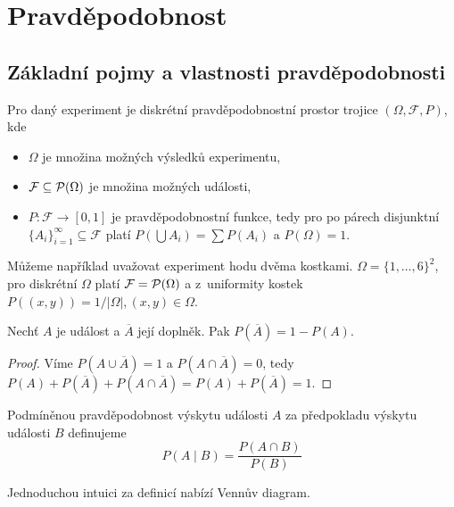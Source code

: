 \section{Pravděpodobnost}

\subsection{Základní pojmy a vlastnosti pravděpodobnosti}

\begin{definition}
Pro daný experiment je diskrétní pravděpodobnostní prostor trojice
$(\Omega, \mathcal{F}, P)$,
kde
\begin{itemize}
    \item $\Omega$ je množina možných výsledků experimentu,
    \item $\mathcal{F} \subseteq \mathcal{P}(\Omega)$ je množina možných události,
    \item $P : \mathcal{F} \to [0,1]$ je pravděpodobnostní funkce, tedy
        pro po párech disjunktní $\{A_i\}_{i=1}^\infty \subseteq \mathcal{F}$ platí
        $P(\bigcup A_i) = \sum P(A_i)$ a $P(\Omega) = 1$.
\end{itemize}
\end{definition}

\begin{example}
    Můžeme například uvažovat experiment hodu dvěma kostkami.
    $\Omega = \{1,\ldots,6\}^2$, pro diskrétní $\Omega$ platí
    $\mathcal{F} = \mathcal{P}(\Omega)$ a z~uniformity kostek
    $P((x,y)) = 1/\lvert \Omega \rvert, (x,y) \in \Omega$.
\end{example}

\begin{claim}
    Nechť $A$ je událost a $\overline{A}$ její doplněk. Pak
    $P(\overline{A}) = 1 - P(A)$.
\end{claim}

\begin{proof}
    Víme $P(A \cup \overline{A}) = 1$ a $P(A \cap \overline{A}) = 0$,
	tedy $P(A) + P(\overline{A}) + P(A \cap \overline{A}) = P(A) + P(\overline{A}) = 1$.
\end{proof}

\begin{definition}
Podmíněnou pravděpodobnost výskytu události $A$ za předpokladu výskytu
události $B$ definujeme
\[
    P(A \mid B) = \frac{P(A \cap B)}{P(B)}
\]
\end{definition}

Jednoduchou intuici za definicí nabízí Vennův diagram.

